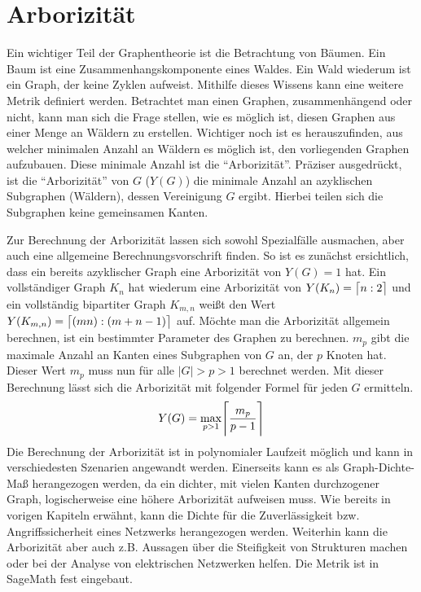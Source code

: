 \documentclass[a4paper,12pt,ngerman,chapterprefix=false,listof=totoc,bibliography=totoc]{scrreprt}
\DeclarePairedDelimiter{\ceil}{\lceil}{\rceil}
\begin{document}
\section{Arborizität}
{
Ein wichtiger Teil der Graphentheorie ist die Betrachtung von Bäumen. Ein Baum ist eine Zusammenhangskomponente eines Waldes. Ein Wald wiederum ist ein Graph, der keine Zyklen aufweist. Mithilfe dieses Wissens kann eine weitere Metrik definiert werden. Betrachtet man einen Graphen, zusammenhängend oder nicht, kann man sich die Frage stellen, wie es möglich ist, diesen Graphen aus einer Menge an Wäldern zu erstellen. Wichtiger noch ist es herauszufinden, aus welcher minimalen Anzahl an Wäldern es möglich ist, den vorliegenden Graphen aufzubauen. Diese minimale Anzahl ist die "`Arborizität"'. Präziser ausgedrückt, ist die "`Arborizität"' von \(G\) (\(Y(G)\)) die minimale Anzahl an azyklischen Subgraphen (Wäldern), dessen Vereinigung \(G\) ergibt. Hierbei teilen sich die Subgraphen keine gemeinsamen Kanten. \cite{weisstein_arboricity_nodate}

Zur Berechnung der Arborizität lassen sich sowohl Spezialfälle ausmachen, aber auch eine allgemeine Berechnungsvorschrift finden. So ist es zunächst ersichtlich, dass ein bereits azyklischer Graph eine Arborizität von \(Y(G)=1\) hat. Ein vollständiger Graph \(K_n\) hat wiederum eine Arborizität von \(Y(K_n)=\ceil[\big]{n:2}\) und ein vollständig bipartiter Graph \(K_{m,n}\) weißt den Wert \(Y(K_{m,n})=\ceil[\big]{(mn):(m+n-1)}\) auf. Möchte man die Arborizität allgemein berechnen, ist ein bestimmter Parameter des Graphen zu berechnen. \(m_p\) gibt die maximale Anzahl an Kanten eines Subgraphen von \(G\) an, der \(p\) Knoten hat. Dieser Wert \(m_p\) muss nun für alle \(|G|>p>1\) berechnet werden. Mit dieser Berechnung lässt sich die Arborizität mit folgender Formel für jeden \(G\) ermitteln. \cite{weisstein_arboricity_nodate,nash-williams_edge-disjoint_1961}
\[Y(G)=\max_{p>1}\ceil[\Bigg]{\frac{m_p}{p-1}}\]
Die Berechnung der Arborizität ist in polynomialer Laufzeit möglich und kann in verschiedesten Szenarien angewandt werden. Einerseits kann es als Graph-Dichte-Maß herangezogen werden, da ein dichter, mit vielen Kanten durchzogener Graph, logischerweise eine höhere Arborizität aufweisen muss. Wie bereits in vorigen Kapiteln erwähnt, kann die Dichte für die Zuverlässigkeit bzw. Angriffssicherheit eines Netzwerks herangezogen werden. Weiterhin kann die Arborizität aber auch z.B. Aussagen über die Steifigkeit von Strukturen machen oder bei der Analyse von elektrischen Netzwerken helfen. Die Metrik ist in SageMath fest eingebaut. \cite{gabow_forests_1992,sagemath_graph_2020}

}
\end{document}
